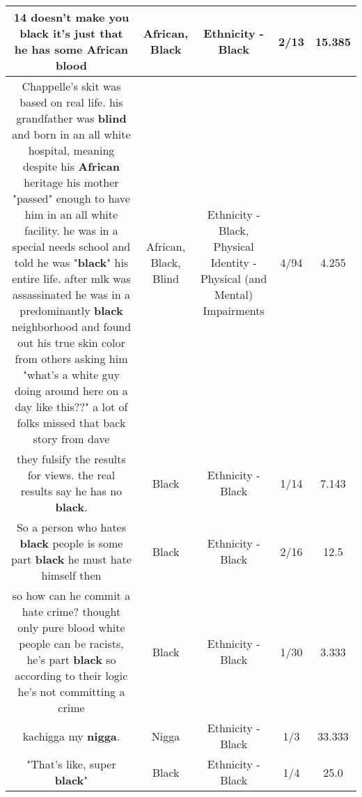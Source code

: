 \documentclass[11pt]{article}
\newlength\mylength
\begin{document}
\begin{center}
\begin{longtable}{|C{.65\mylength}|C{.30\mylength}|C{.12\mylength}|C{.12\mylength}|C{.12\mylength}|}
  \small 14 doesn't make you \textbf{black} it's just that he has some \textbf{African} blood\normalsize   & African, Black & Ethnicity - Black & 2/13 & 15.385 \\  \hline
  \small Chappelle's skit was based on real life. his grandfather was \textbf{blind}  and born in an all white hospital, meaning despite his \textbf{African} heritage his mother "passed" enough to have him in an all white facility. he was in a special needs school and told he was "\textbf{black}" his entire life. after mlk was assassinated he was in a predominantly \textbf{black} neighborhood and found out his true skin color from others asking  him "what's a white guy doing around here on a day like this??" a lot of folks missed that back story from dave\normalsize   & African, Black, Blind & Ethnicity - Black, Physical Identity - Physical (and Mental) Impairments & 4/94 & 4.255 \\  \hline
  \small they fulsify the results for views. the real results say he has no \textbf{black}.\normalsize   & Black & Ethnicity - Black & 1/14 & 7.143 \\  \hline
  \small So a person who hates \textbf{black} people is some part \textbf{black} he must hate himself then\normalsize   & Black & Ethnicity - Black & 2/16 & 12.5 \\  \hline
  \small so how can he commit a hate crime? thought only pure blood white people can be racists, he's part \textbf{black} so according to their logic he's not committing a crime\normalsize   & Black & Ethnicity - Black & 1/30 & 3.333 \\  \hline
  \small kachigga my \textbf{nigga}.\normalsize   & Nigga & Ethnicity - Black & 1/3 & 33.333 \\  \hline
  \small "That's like, super \textbf{black}"\normalsize   & Black & Ethnicity - Black & 1/4 & 25.0 \\  \hline

\end{longtable}
\end{center}
\end{document}
